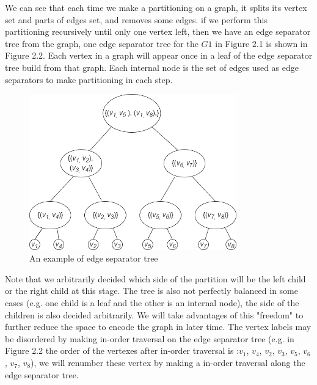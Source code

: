 \documentclass[12pt,glossary]{dalthesis}
\begin{document}
\bigskip

We can see that each time we make a partitioning on a graph, it splits its vertex set and parts of edges set, and removes some edges. if we perform this partitioning recursively until only one vertex left, then we have an edge separator tree from the graph, one edge separator tree for the $G1$ in Figure 2.1 is shown in Figure 2.2. Each vertex in a graph will appear once in a leaf of the edge separator tree build from that graph. Each internal node is the set of edges used as edge separators to make partitioning in each step.

\begin{figure}[ht]
\centering
\includegraphics[width=0.8\textwidth]{separatorTree}
\caption{An example of edge separator tree}
\end{figure}

\bigskip
\bigskip
Note that we arbitrarily decided which side of the partition will be the left child or the right child at this stage. The tree is also not perfectly balanced in some cases (e.g. one child is a leaf and the other is an internal node), the side of the children is also decided arbitrarily. We will take advantages of this "freedom" to further reduce the space to encode the graph in later time. The vertex labels may be disordered by making in-order traversal on the edge separator tree (e.g. in Figure 2.2 the order of the vertexes after in-order traversal is :$v_{1}$, $v_{4}$, $v_{2}$, $v_{3}$, $v_{5}$, $v_{6}$, $v_{7}$, $v_{8}$), we will renumber these vertex by making a in-order traversal along the edge separator tree.

\bigskip
\bigskip
\end{document}
